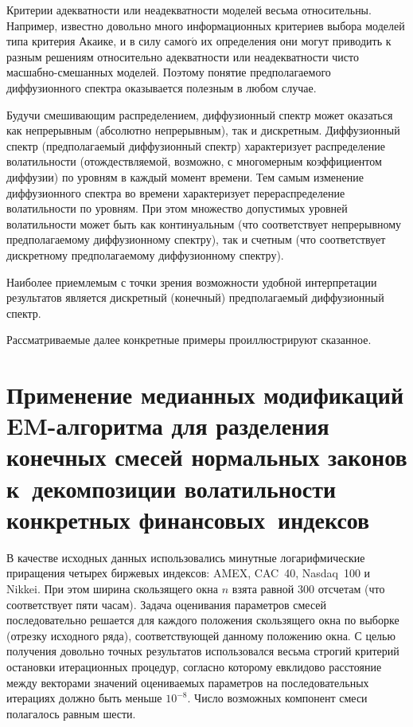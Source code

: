 \begin{multicols}{2}
Критерии адекватности или неадекватности моделей весьма
относительны. Например, известно довольно много информационных
критериев выбора моделей типа критерия Акаике, и в силу самог$\acute{\mbox{о}}$
их определения они могут приводить к разным решениям относительно
адекватности или неадекватности чисто масшабно-смешанных моделей.
Поэтому понятие предполагаемого диффузионного спектра оказывается
полезным в любом случае.

Будучи смешивающим распределением, диффузионный спектр может
оказаться как непрерывным (абсолютно непрерывным), так и
дискретным. Диффузионный спектр (предполагаемый диффузионный
спектр) характеризует распределение волатильности (отождествляемой,
возможно, с многомерным коэффициентом диффузии) по уровням в
каждый момент времени. Тем самым изменение диффузионного спектра
во времени характеризует перераспределение волатильности по
уровням. При этом множество допустимых уровней волатильности может
быть как континуальным (что\linebreak
соответствует непрерывному
предполагаемому диффузионному спектру), так и счетным (что
соответствует дискретному предполагаемому диффузионному спектру).

Наиболее приемлемым с точки зрения возможности удобной
интерпретации результатов является дискретный (конечный)
предполагаемый диффузионный спектр.

Рассматриваемые далее конкретные примеры проиллюстрируют
сказанное.

\section{Применение медианных модификаций EM-алгоритма для разделения
конечных смесей нормальных законов к~декомпозиции волатильности
конкретных финансовых~индексов}

\label{em}

В качестве исходных данных использовались минутные логарифмические
приращения четырех биржевых индексов: AMEX, CAC~40, Nasdaq~100 и
Nikkei. При этом ширина скользящего окна $n$ взята равной $300$
отсчетам (что соответствует пяти часам). Задача оценивания
параметров смесей последовательно решается для каждого положения
скользящего окна по выборке (отрезку исходного ряда),
соответствующей данному положению окна. С целью получения довольно
точных результатов использовался весьма строгий критерий остановки
итерационных процедур, согласно которому евклидово расстояние
между векторами значений оцениваемых параметров на
последовательных итерациях должно быть меньше $10^{-8}$. Число
возможных компонент смеси полагалось равным шести.


\end{multicols}

